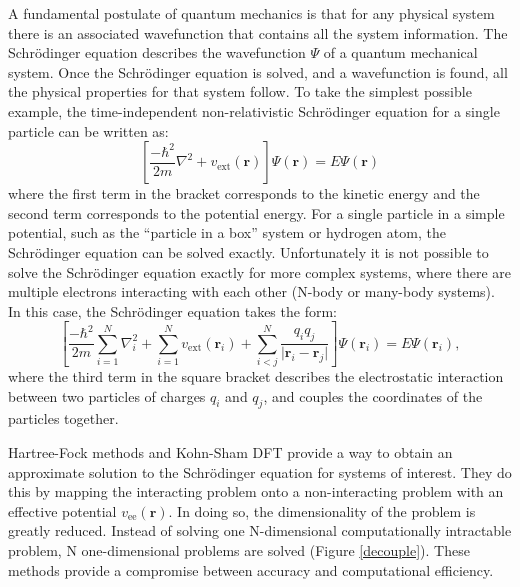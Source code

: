 A fundamental postulate of quantum mechanics is that for any physical system there is an associated wavefunction that contains all the system information.
The Schr\"{o}dinger equation describes the wavefunction $\Psi$ of a quantum mechanical system.  Once the Schr\"{o}dinger equation is solved, and a wavefunction is found, all the physical properties for that system follow. To take the simplest possible example, the time-independent non-relativistic Schr\"{o}dinger equation for a single particle can be written as:
\begin{equation} \label{singleparticle}
\left[\frac{-\hbar^2}{2m}\nabla^2+v_\textrm{ext}(\textbf{r})\right]\Psi(\textbf{r}) = E\Psi(\textbf{r})
\end{equation}
where the first term in the bracket corresponds to the kinetic energy and the second term corresponds to the potential energy. For a single particle in a simple potential, such as the ``particle in a box'' system or hydrogen atom, the Schr\"{o}dinger equation can be solved exactly. Unfortunately it is not possible to solve the Schr\"{o}dinger equation exactly for more complex systems, where there are multiple electrons interacting with each other (N-body or many-body systems). In this case, the Schr\"{o}dinger equation takes the form:
\begin{equation}
\left[\frac{-\hbar^2}{2m}\sum_{i=1}^N\nabla_i^2+\sum_{i=1}^Nv_{\textrm{ext}}(\textbf{r}_i)+\sum_{i<j}^N\frac{q_iq_j}{\lvert\textbf{r}_i-\textbf{r}_j\rvert}\right]\Psi(\textbf{r}_i) = E\Psi(\textbf{r}_i),
\end{equation}
where the third term in the square bracket describes the electrostatic interaction between two particles of charges $q_i$ and $q_j$, and couples the coordinates of the particles together.

Hartree-Fock methods and Kohn-Sham DFT provide a way to obtain an approximate solution to the Schr\"{o}dinger equation for systems of interest. They do this by mapping the interacting problem onto a non-interacting problem with an effective potential $v_\textrm{ee}(\textbf{r})$. In doing so, the dimensionality of the problem is greatly reduced. Instead of solving one N-dimensional computationally intractable problem, N one-dimensional problems are solved (Figure \ref{decouple}). These methods provide a compromise between accuracy and computational efficiency.

